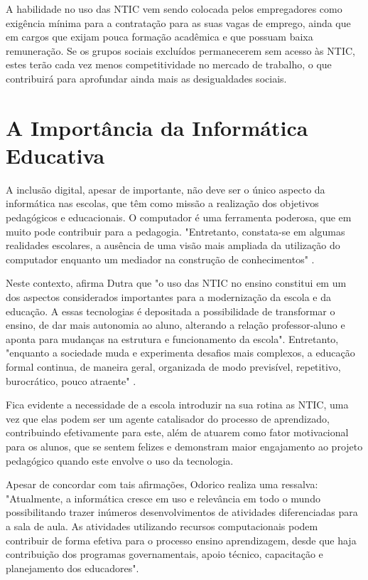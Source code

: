 A habilidade no uso das NTIC vem sendo colocada pelos empregadores como exigência mínima para a contratação para as suas vagas de emprego, ainda que em cargos que exijam pouca formação acadêmica e que possuam baixa remuneração. Se os grupos sociais excluídos permanecerem sem acesso às NTIC, estes terão cada vez menos competitividade no mercado de trabalho, o que contribuirá para aprofundar ainda mais as desigualdades sociais.

\section{A Importância da Informática Educativa}\label{sec:LABEL_CHP_REF_TEO_SEC_IE}

A inclusão digital, apesar de importante, não deve ser o único aspecto da informática nas escolas, que têm como missão a realização dos objetivos pedagógicos e educacionais. O computador é uma ferramenta poderosa, que em muito pode contribuir para a pedagogia. "Entretanto, constata-se em algumas realidades escolares, a ausência de uma visão mais ampliada da utilização do computador enquanto um mediador na construção de conhecimentos" \cite{art:REF_ART_CARVALHO_MONTEIRO}.

Neste contexto, afirma Dutra \cite{art:REF_DISS_DUTRA} que "o uso das NTIC no ensino constitui em um dos aspectos considerados importantes para a modernização da escola e da educação. A essas tecnologias é depositada a possibilidade de transformar o ensino, de dar mais autonomia ao aluno, alterando a relação professor-aluno e aponta para mudanças na estrutura e funcionamento da escola". Entretanto, "enquanto a sociedade muda e experimenta desafios mais complexos, a educação formal continua, de maneira geral, organizada de modo previsível, repetitivo, burocrático, pouco atraente" \cite{art:REF_LIVRO_MORAN}.

Fica evidente a necessidade de a escola introduzir na sua rotina as NTIC, uma vez que elas podem ser um agente catalisador do processo de aprendizado, contribuindo efetivamente para este, além de atuarem como fator motivacional para os alunos, que se sentem felizes e demonstram maior engajamento ao projeto pedagógico quando este envolve o uso da tecnologia.

Apesar de concordar com tais afirmações, Odorico \cite{art:REF_ART_ODORICO} realiza uma ressalva: "Atualmente, a informática cresce em uso e relevância em todo o mundo possibilitando trazer inúmeros desenvolvimentos de atividades diferenciadas para a sala de aula. As atividades utilizando recursos computacionais podem contribuir de forma efetiva para o processo ensino aprendizagem, desde que haja contribuição dos programas governamentais, apoio técnico, capacitação e planejamento dos educadores".

